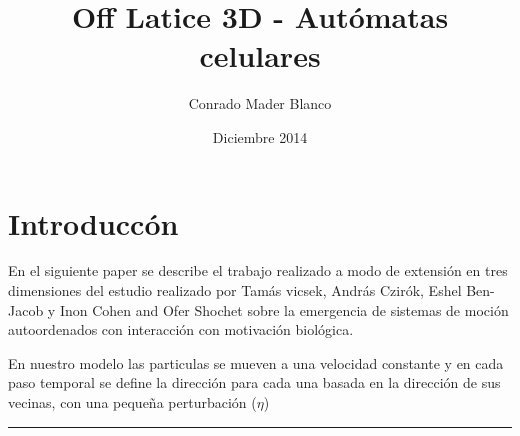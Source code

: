 \documentclass{article}
\title{Off Latice 3D - Aut\'omatas celulares}
\author{Conrado Mader Blanco }
\date{Diciembre 2014}
\begin{document}
\maketitle

\section{Introducc\'on}

\par En el siguiente paper se describe el trabajo realizado a modo de extensi\'on en tres dimensiones del estudio realizado por Tam\'as vicsek, Andr\'as Czir\'ok, Eshel Ben-Jacob y Inon Cohen and Ofer Shochet sobre la emergencia de sistemas de moci\'on autoordenados con interacci\'on con motivaci\'on biol\'ogica.
\par En nuestro modelo las particulas se mueven a una velocidad constante y en cada paso temporal se define la direcci\'on para cada una basada en la direcci\'on de sus vecinas, con una pequeña perturbaci\'on ($\eta$)
\\
\begin{center}
\rule{4cm}{0.4pt}
\end{center}
\end{document}
